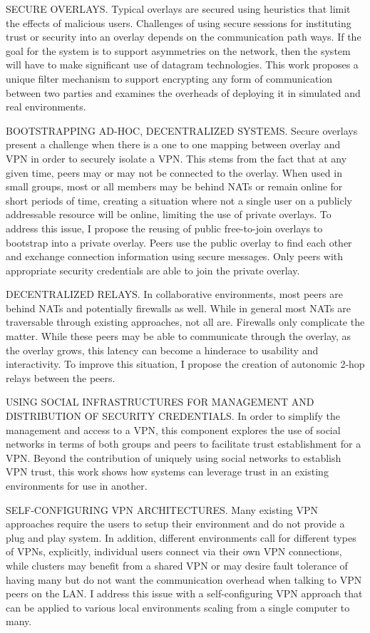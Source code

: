 SECURE OVERLAYS. Typical overlays are secured using heuristics that limit the
effects of malicious users.  Challenges of using secure sessions for
instituting trust or security into an overlay depends on the communication
path ways.  If the goal for the system is to support asymmetries on the
network, then the system will have to make significant use of datagram
technologies.  This work proposes a unique filter mechanism to support
encrypting any form of communication between two parties and examines the
overheads of deploying it in simulated and real environments.

BOOTSTRAPPING AD-HOC, DECENTRALIZED SYSTEMS. Secure overlays present a
challenge when there is a one to one mapping between overlay and VPN in order
to securely isolate a VPN.  This stems from the fact that at any given time,
peers may or may not be connected to the overlay.  When used in small groups,
most or all members may be behind NATs or remain online for short periods of
time, creating a situation where not a single user on a publicly addressable
resource will be online, limiting the use of private overlays.  To address
this issue, I propose the reusing of public free-to-join overlays to bootstrap
into a private overlay.  Peers use the public overlay to find each other and
exchange connection information using secure messages.  Only peers with
appropriate security credentials are able to join the private overlay.

DECENTRALIZED RELAYS. In collaborative environments, most peers are behind NATs
and potentially firewalls as well.  While in general most NATs are traversable
through existing approaches, not all are.  Firewalls only complicate the
matter.  While these peers may be able to communicate through the overlay, as
the overlay grows, this latency can become a hinderace to usability and
interactivity.  To improve this situation, I propose the creation of autonomic
2-hop relays between the peers.

USING SOCIAL INFRASTRUCTURES FOR MANAGEMENT AND DISTRIBUTION OF SECURITY
CREDENTIALS. In order to simplify the management and access to a VPN, this
component explores the use of social networks in terms of both groups and
peers to facilitate trust establishment for a VPN.  Beyond the contribution of
uniquely using social networks to establish VPN trust, this work shows how
systems can leverage trust in an existing environments for use in another.

SELF-CONFIGURING VPN ARCHITECTURES. Many existing VPN approaches require the
users to setup their environment and do not provide a plug and play system.  In
addition, different environments call for different types of VPNs, explicitly,
individual users connect via their own VPN connections, while clusters may
benefit from a shared VPN or may desire fault tolerance of having many but do
not want the communication overhead when talking to VPN peers on the LAN.  I
address this issue with a self-configuring VPN approach that can be applied to
various local environments scaling from a single computer to many.


